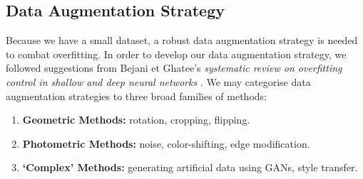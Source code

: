 


\subsection{Data Augmentation Strategy}

Because we have a small dataset, a robust data augmentation strategy is needed to combat overfitting. In order to develop our data augmentation strategy, we followed suggestions from Bejani et Ghatee's \emph{systematic review on overfitting control in shallow and deep neural networks} \autocite{overfitting-prevention}. We may categorise data augmentation strategies to three broad families of methods: \autocite{augmentation-strategies}

\begin{enumerate}
    \item \textbf{Geometric Methods:} rotation, cropping, flipping.
    \item \textbf{Photometric Methods:} noise, color-shifting, edge modification.
    \item \textbf{\enquote*{Complex} Methods:} generating artificial data using GANs, style transfer.
\end{enumerate}

